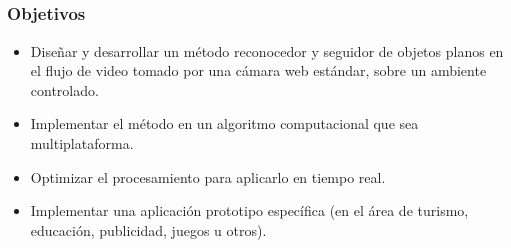 \subsection*{}
\begin{frame}
  \frametitle{Objetivos}
    \begin{itemize}
	\item Diseñar y desarrollar un método reconocedor y seguidor de objetos planos en el flujo de video tomado por una cámara web estándar, sobre un ambiente controlado.
	\item Implementar el método en un algoritmo computacional que sea multiplataforma.
	\item Optimizar el procesamiento para aplicarlo en tiempo real. 
	\item Implementar una aplicación prototipo específica (en el área de turismo, educación, publicidad, juegos u otros).
    \end{itemize}
\end{frame}

